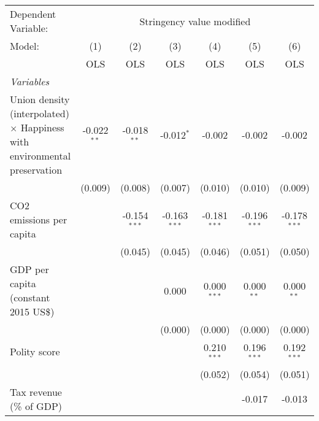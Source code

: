 
\begingroup
\centering
\begin{tabular}{lcccccc}
   \toprule
   Dependent Variable: & \multicolumn{6}{c}{Stringency value modified}\\
   Model:                                                                           & (1)           & (2)            & (3)            & (4)            & (5)            & (6)\\  
                                                                                    &  OLS          & OLS            & OLS            & OLS            & OLS            & OLS\\  
   \midrule
   \emph{Variables}\\
   Union density (interpolated) $\times$ Happiness with environmental preservation  & -0.022$^{**}$ & -0.018$^{**}$  & -0.012$^{*}$   & -0.002         & -0.002         & -0.002\\   
                                                                                    & (0.009)       & (0.008)        & (0.007)        & (0.010)        & (0.010)        & (0.009)\\   
   CO2 emissions per capita                                                         &               & -0.154$^{***}$ & -0.163$^{***}$ & -0.181$^{***}$ & -0.196$^{***}$ & -0.178$^{***}$\\   
                                                                                    &               & (0.045)        & (0.045)        & (0.046)        & (0.051)        & (0.050)\\   
   GDP per capita (constant 2015 US\$)                                              &               &                & 0.000          & 0.000$^{***}$  & 0.000$^{**}$   & 0.000$^{**}$\\   
                                                                                    &               &                & (0.000)        & (0.000)        & (0.000)        & (0.000)\\   
   Polity score                                                                     &               &                &                & 0.210$^{***}$  & 0.196$^{***}$  & 0.192$^{***}$\\   
                                                                                    &               &                &                & (0.052)        & (0.054)        & (0.051)\\   
   Tax revenue (\% of GDP)                                                          &               &                &                &                & -0.017         & -0.013\\   

\end{tabular}
